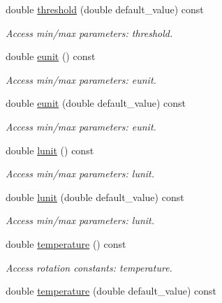 \begin{DoxyCompactItemize}
double \hyperlink{struct_d_d4hep_1_1_x_m_l_1_1_dimension_a05b7e800aefeec9945c59e2f7c25a1d2}{threshold} (double default\_\-value) const 
\begin{DoxyCompactList}\small\item\em Access min/max parameters: threshold. \item\end{DoxyCompactList}\item 
double \hyperlink{struct_d_d4hep_1_1_x_m_l_1_1_dimension_a39d0f18922e9d8520aaec40d296ae27d}{eunit} () const 
\begin{DoxyCompactList}\small\item\em Access min/max parameters: eunit. \item\end{DoxyCompactList}\item 
double \hyperlink{struct_d_d4hep_1_1_x_m_l_1_1_dimension_a8e66ed268a1122ddad6ba84aed7866ed}{eunit} (double default\_\-value) const 
\begin{DoxyCompactList}\small\item\em Access min/max parameters: eunit. \item\end{DoxyCompactList}\item 
double \hyperlink{struct_d_d4hep_1_1_x_m_l_1_1_dimension_a625e97d42353e36b1233980ccdacc701}{lunit} () const 
\begin{DoxyCompactList}\small\item\em Access min/max parameters: lunit. \item\end{DoxyCompactList}\item 
double \hyperlink{struct_d_d4hep_1_1_x_m_l_1_1_dimension_a5a6b0e171412756cf3f1e97609f71404}{lunit} (double default\_\-value) const 
\begin{DoxyCompactList}\small\item\em Access min/max parameters: lunit. \item\end{DoxyCompactList}\item 
double \hyperlink{struct_d_d4hep_1_1_x_m_l_1_1_dimension_ad8aabbcaefc74e0a5155434c6ecdcab4}{temperature} () const 
\begin{DoxyCompactList}\small\item\em Access rotation constants: temperature. \item\end{DoxyCompactList}\item 
double \hyperlink{struct_d_d4hep_1_1_x_m_l_1_1_dimension_ae6862cd516abc3114596dd7a77c3ca61}{temperature} (double default\_\-value) const 

\end{DoxyCompactItemize}
